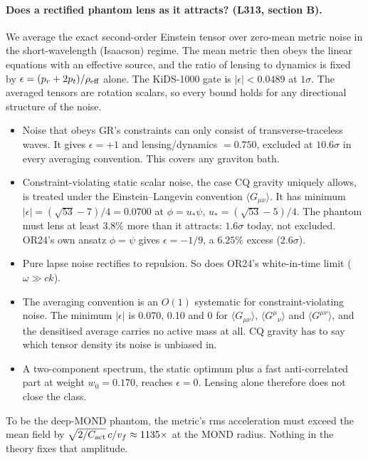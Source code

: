 \documentclass[10pt]{article}
\begin{document}
\paragraph{Does a rectified phantom lens as it attracts? (L313, section B).}
We average the exact second-order Einstein tensor over zero-mean metric noise in the short-wavelength (Isaacson) regime. The mean metric then obeys the linear equations with an effective source, and the ratio of lensing to dynamics is fixed by $\epsilon=(p_r+2p_t)/\rho_{\rm eff}$ alone. The KiDS-1000 gate is $|\epsilon|<0.0489$ at $1\sigma$. The averaged tensors are rotation scalars, so every bound holds for any directional structure of the noise.
\begin{itemize}
\item Noise that obeys GR's constraints can only consist of transverse-traceless waves. It gives $\epsilon=+1$ and lensing/dynamics $=0.750$, excluded at $10.6\sigma$ in every averaging convention. This covers any graviton bath.
\item Constraint-violating static scalar noise, the case CQ gravity uniquely allows, is treated under the Einstein--Langevin convention $\langle G_{\mu\nu}\rangle$. It has minimum $|\epsilon|=(\sqrt{53}-7)/4=0.0700$ at $\phi=u_*\psi$, $u_*=(\sqrt{53}-5)/4$. The phantom must lens at least $3.8\%$ more than it attracts: $1.6\sigma$ today, not excluded. OR24's own ansatz $\phi=\psi$ gives $\epsilon=-1/9$, a $6.25\%$ excess ($2.6\sigma$).
\item Pure lapse noise rectifies to repulsion. So does OR24's white-in-time limit ($\omega\gg ck$).
\item The averaging convention is an $O(1)$ systematic for constraint-violating noise. The minimum $|\epsilon|$ is 0.070, 0.10 and 0 for $\langle G_{\mu\nu}\rangle$, $\langle G^\mu{}_\nu\rangle$ and $\langle G^{\mu\nu}\rangle$, and the densitised average carries no active mass at all. CQ gravity has to say which tensor density its noise is unbiased in.
\item A two-component spectrum, the static optimum plus a fast anti-correlated part at weight $w_0=0.170$, reaches $\epsilon=0$. Lensing alone therefore does not close the class.
\end{itemize}
To be the deep-MOND phantom, the metric's rms acceleration must exceed the mean field by $\sqrt{2/C_{\rm act}}\,c/v_f\approx1135\times$ at the MOND radius. Nothing in the theory fixes that amplitude.
\end{document}
